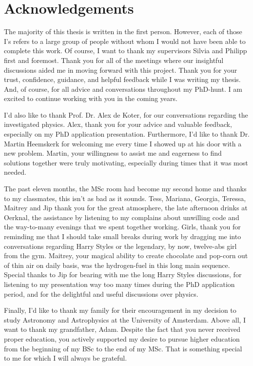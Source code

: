 \chapter*{Acknowledgements}

The majority of this thesis is written in the first person. However, each of those I's refers to a large group of people without whom I would not have been able to complete this work. Of course, I want to thank my supervisors Silvia and Philipp first and foremost. Thank you for all of the meetings where our insightful discussions aided me in moving forward with this project. Thank you for your trust, confidence, guidance, and helpful feedback while I was writing my thesis. And, of course, for all advice and conversations throughout my PhD-hunt. I am excited to continue working with you in the coming years.

I'd also like to thank Prof. Dr. Alex de Koter, for our conversations regarding the investigated physics. Alex, thank you for your advice and valuable feedback, especially on my PhD application presentation. Furthermore, I'd like to thank Dr. Martin Heemskerk for welcoming me every time I showed up at his door with a new problem. Martin, your willingness to assist me and eagerness to find solutions together were truly motivating, especially during times that it was most needed.

The past eleven months, the MSc room had become my second home and thanks to my classmates, this isn't as bad as it sounds. Tess, Mariana, Georgia, Teressa, Maitrey and Jip thank you for the great 
atmosphere, the late afternoon drinks at Oerknal, the assistance by listening to my complains about unwilling code and the way-to-many evenings that we spent together working. Girls, thank you for reminding me that I should take small breaks during work by dragging me into conversations regarding Harry Styles or the legendary, by now, twelve-abs girl from the gym. Maitrey, your magical ability to create chocolate and pop-corn out of thin air on daily basis, was the hydrogen-fuel in this long main sequence. Special thanks to Jip for bearing with me the long Harry Styles discussions, for listening to my presentation way too many times during the PhD application period, and for the delightful and useful discussions over physics. 

Finally, I'd like to thank my family for their encouragement in my decision to study Astronomy and Astrophysics at the University of Amsterdam. Above all, I want to thank my grandfather, Adam. Despite the fact that you never received proper education, you actively supported my desire to pursue higher education from the beginning of my BSc to the end of my MSc. That is something special to me for which I will always be grateful.
